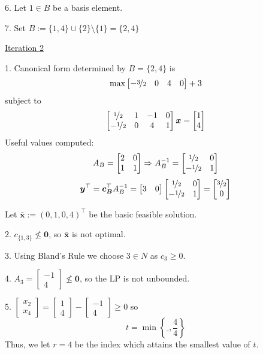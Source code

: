 6. Let $ 1\in B $ be a basis element.

7. Set $ B:=\{1,4\}\cup \{2\}\setminus\{1\}=\{2,4\} $

\underline{Iteration 2}

1. Canonical form determined by $ B=\{2,4\} $ is
\[ \max 
\begin{bmatrix}
    -\nicefrac{3}{2} & 0 & 4 & 0
\end{bmatrix} + 3\]
subject to
\[ 
\begin{bmatrix}
    \nicefrac{1}{2} & 1 & -1 & 0\\
    -\nicefrac{1}{2} & 0 & 4 & 1
\end{bmatrix}\bm{x}=
\begin{bmatrix}
    1\\
    4
\end{bmatrix}
\]
Useful values computed:
\[ A_B=
\begin{bmatrix}
    2 & 0\\
    1 & 1\\
\end{bmatrix} \Rightarrow
A_B^{-1}=
\begin{bmatrix}
    \nicefrac{1}{2} & 0\\
    -\nicefrac{1}{2} & 1\\
\end{bmatrix} \]
\[ \bm{y}^\top=\bm{c_B}^\top A_B^{-1}=
\begin{bmatrix}
    3 & 0
\end{bmatrix}
\begin{bmatrix}
    \nicefrac{1}{2} & 0\\
    -\nicefrac{1}{2} & 1\\
\end{bmatrix}=
\begin{bmatrix}
    \nicefrac{3}{2} \\
    0
\end{bmatrix}\]

Let $ \bm{\bar{x}}:=(0,1,0,4)^\top $ be the basic feasible solution.

2. $ c_{\{1,3\}} \nleq \bm{0} $, so $ \bm{\bar{x}} $ is not optimal.

3. Using Bland's Rule we choose $ 3\in N $ as $ c_3\ge 0 $.

4.
$ 
A_3= \begin{bmatrix}
    -1\\
    4
\end{bmatrix}\nleq \bm{0}
$,
so the LP is not unbounded.

5.
$
\begin{bmatrix}
    x_2\\
    x_4
\end{bmatrix}
=
\begin{bmatrix}
    1\\
    4
\end{bmatrix}-
\begin{bmatrix}
    -1\\
    4
\end{bmatrix}\ge 0
$
so
\[ t=\min \left\{\_,\frac{4}{4} \right\} \]
Thus, we let $ r=4 $ be the index which attains the smallest value of $ t $.

